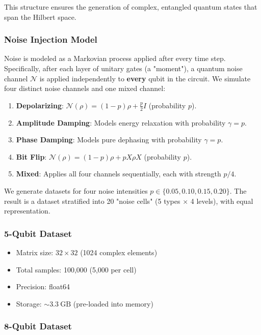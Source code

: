 \documentclass[11pt]{article}
\begin{document}
This structure ensures the generation of complex, entangled quantum states that span the Hilbert space.

\subsubsection{Noise Injection Model}
\label{sec:org6f6c345}

Noise is modeled as a Markovian process applied after every time step. Specifically, after each layer of unitary gates (a "moment"), a quantum noise channel \(\mathcal{N}\) is applied independently to \textbf{every} qubit in the circuit. We simulate four distinct noise channels and one mixed channel:

\begin{enumerate}
\item \textbf{Depolarizing}: \(\mathcal{N}(\rho) = (1-p)\rho + \frac{p}{2}I\) (probability \(p\)).
\item \textbf{Amplitude Damping}: Models energy relaxation with probability \(\gamma=p\).
\item \textbf{Phase Damping}: Models pure dephasing with probability \(\gamma=p\).
\item \textbf{Bit Flip}: \(\mathcal{N}(\rho) = (1-p)\rho + p X\rho X\) (probability \(p\)).
\item \textbf{Mixed}: Applies all four channels sequentially, each with strength \(p/4\).
\end{enumerate}

We generate datasets for four noise intensities \(p \in \{0.05, 0.10, 0.15, 0.20\}\). The result is a dataset stratified into 20 "noise cells" (5 types \(\times\) 4 levels), with equal representation.

\subsubsection{5-Qubit Dataset}
\label{sec:orgc643be1}

\begin{itemize}
\item Matrix size: \(32 \times 32\) (1024 complex elements)
\item Total samples: 100,000 (5,000 per cell)
\item Precision: float64
\item Storage: \(\sim 3.3\ \mathrm{GB}\) (pre-loaded into memory)
\end{itemize}

\subsubsection{8-Qubit Dataset}
\label{sec:org1da2f33}
\end{document}
